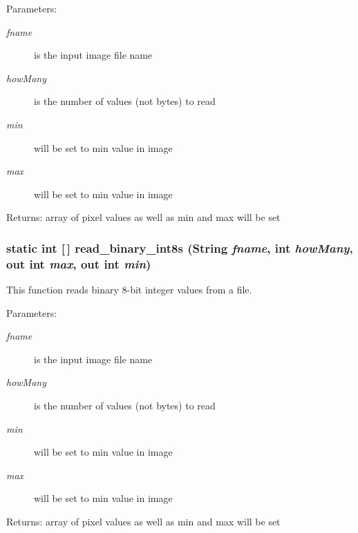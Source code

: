 \begin{Desc}
\item[Parameters:]
\begin{description}
\item[{\em fname}]is the input image file name \item[{\em how\-Many}]is the number of values (not bytes) to read \item[{\em min}]will be set to min value in image \item[{\em max}]will be set to min value in image\end{description}
\end{Desc}
\begin{Desc}
\item[Returns:]array of pixel values as well as min and max will be set \end{Desc}
\subsubsection{\setlength{\rightskip}{0pt plus 5cm}static int [$\,$] read\_\-binary\_\-int8s (String {\em fname}, int {\em how\-Many}, out int {\em max}, out int {\em min})\hspace{0.3cm}{\tt  [static, protected]}}\label{class_c_s_image_viewer_1_1pnm_helper_aec73e6bedb159d8b8f6b6258b4aff13}


This function reads binary 8-bit integer values from a file. 

\begin{Desc}
\item[Parameters:]
\begin{description}
\item[{\em fname}]is the input image file name \item[{\em how\-Many}]is the number of values (not bytes) to read \item[{\em min}]will be set to min value in image \item[{\em max}]will be set to min value in image\end{description}
\end{Desc}
\begin{Desc}
\item[Returns:]array of pixel values as well as min and max will be set \end{Desc}
